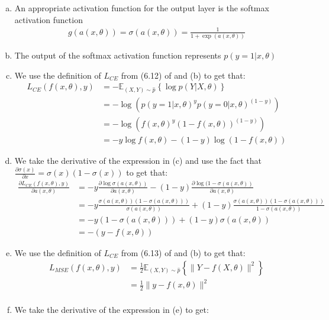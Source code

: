 \documentclass[paper=a4, fontsize=11pt]{scrartcl} %
\numberwithin{equation}{section} %
\numberwithin{figure}{section} %
\numberwithin{table}{section} %
\newcommand{\Ex}[2]{\mathbb{E}_{#1}\left\{#2\right\}}
\newcommand{\dP}[2]{\frac{\partial #1}{\partial #2}}
\begin{document}
\begin{enumerate}[(a)]
	\item An appropriate activation function for the output layer is the softmax activation function
	\begin{align*}
	g(a(x,\theta)) = \sigma(a(x,\theta)) = \frac{1}{1+\exp(a(x,\theta))}
	\end{align*}
	\item The output of the softmax activation function represents $p(y=1|x,\theta)$
	\item We use the definition of $L_{CE}$ from (6.12) of \cite{Goodfellow-et-al-2016} and (b) to get that:
	\begin{align*}
	L_{CE}(f(x,\theta),y)&=-\Ex{(X,Y)\sim \hat{p}}{\log p(Y|X,\theta)} \\
	&= -\log \left( p(y=1|x,\theta)^y p(y=0|x,\theta)^{(1-y)} \right) \\
	&= -\log \left( f(x,\theta)^y (1-f(x,\theta))^{(1-y)} \right)\\
	&= -y\log f(x,\theta) - (1-y)\log(1-f(x,\theta))
	\end{align*}
	\item We take the derivative of the expression in (c) and use the fact that \\ $\dP{\sigma(x)}{x}=\sigma(x)(1-\sigma(x))$ to get that:
		\begin{align*}
		\dP{L_{CE}(f(x,\theta),y)}{a(x,\theta)} &= -y\dP{\log \sigma(a(x, \theta))}{a(x,\theta)} - (1-y)\dP{\log(1-\sigma(a(x, \theta))}{a(x,\theta)}\\
		&= -y\frac{\sigma(a(x, \theta))(1-\sigma(a(x, \theta)))}{\sigma(a(x, \theta))} + (1-y)\frac{\sigma(a(x, \theta))(1-\sigma(a(x, \theta)))}{1-\sigma(a(x, \theta))}\\
		&= -y(1-\sigma(a(x, \theta))) + (1-y)\sigma(a(x, \theta))\\
		&= - (y - f(x, \theta))
		\end{align*}
	\item We use the definition of $L_{CE}$ from (6.13) of \cite{Goodfellow-et-al-2016} and (b) to get that:
		\begin{align*}
		L_{MSE}(f(x,\theta),y)&=\frac{1}{2}\Ex{(X,Y)\sim \hat{p}}{\| Y-f(X,\theta)\|^2} \\
		&=\frac{1}{2}\| y-f(x,\theta)\|^2 \\
		\end{align*}
	\item We take the derivative of the expression in (e) to get:
	\begin{align*}

\end{align*}
\end{enumerate}
\end{document}
